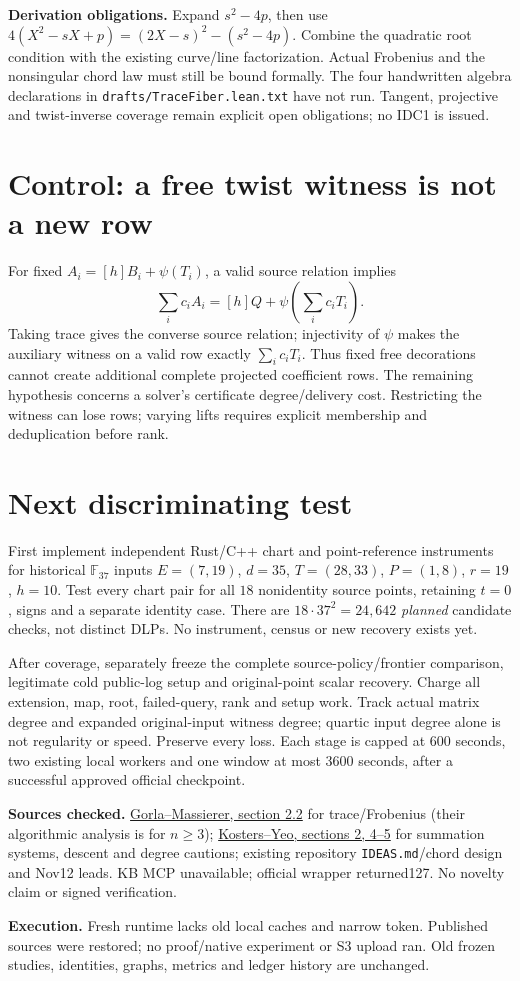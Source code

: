 \documentclass[10pt]{article}
\begin{document}
\textbf{Derivation obligations.}
Expand $s^2-4p$, then use
$4(X^2-sX+p)=(2X-s)^2-(s^2-4p)$.
Combine the quadratic root condition with the existing curve/line
factorization. Actual Frobenius and the nonsingular chord law must still be
bound formally. The four handwritten algebra declarations in
\texttt{drafts/TraceFiber.lean.txt} have not run. Tangent, projective and
twist-inverse coverage remain explicit open obligations; no IDC1 is issued.

\section*{Control: a free twist witness is not a new row}
For fixed $A_i=[h]B_i+\psi(T_i)$, a valid source relation implies
\[
\sum_i c_i A_i=[h]Q+\psi\!\left(\sum_i c_iT_i\right).
\]
Taking trace gives the converse source relation; injectivity of $\psi$
makes the auxiliary witness on a valid row exactly $\sum_i c_iT_i$.
Thus fixed free decorations cannot create additional complete projected
coefficient rows. The remaining hypothesis concerns a solver's certificate
degree/delivery cost. Restricting the witness can lose rows; varying lifts
requires explicit membership and deduplication before rank.

\section*{Next discriminating test}
First implement independent Rust/C++ chart and point-reference instruments
for historical $\mathbb F_{37}$ inputs $E=(7,19)$, $d=35$, $T=(28,33)$,
$P=(1,8)$, $r=19$, $h=10$. Test every chart pair for all $18$ nonidentity
source points, retaining $t=0$, signs and a separate identity case.
There are $18\cdot37^2=24{,}642$ \emph{planned} candidate checks, not distinct
DLPs. No instrument, census or new recovery exists yet.

After coverage, separately freeze the complete source-policy/frontier
comparison, legitimate cold public-log setup and original-point scalar
recovery. Charge all extension, map, root, failed-query, rank and setup work.
Track actual matrix degree and expanded original-input witness degree;
quartic input degree alone is not regularity or speed. Preserve every loss.
Each stage is capped at $600$ seconds, two existing local workers and one
window at most $3600$ seconds, after a successful approved official checkpoint.

\textbf{Sources checked.}
\href{https://arxiv.org/html/1405.1059}{Gorla--Massierer, section 2.2}
for trace/Frobenius (their algorithmic analysis is for $n\ge3$);
\href{https://arxiv.org/html/1503.08001v2}{Kosters--Yeo, sections 2, 4--5}
for summation systems, descent and degree cautions; existing repository
\texttt{IDEAS.md}/chord design and Nov12 leads. KB MCP unavailable; official
wrapper returned127. No novelty claim or signed verification.

\textbf{Execution.} Fresh runtime lacks old local caches and narrow token.
Published sources were restored; no proof/native experiment or S3 upload ran.
Old frozen studies, identities, graphs, metrics and ledger history are unchanged.
\end{document}
